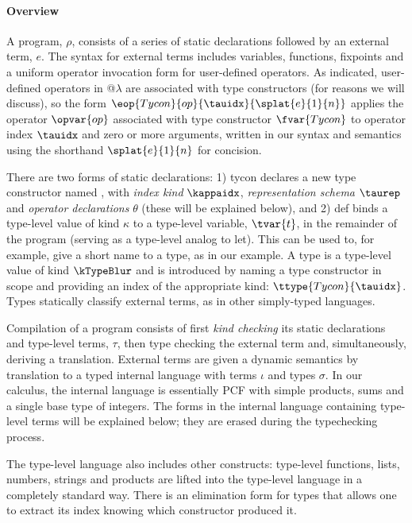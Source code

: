 \paragraph{Overview} A program, $\rho$, consists of a series of static declarations followed by an external term, $e$. The syntax for external terms includes variables, functions, fixpoints and a uniform operator invocation form for user-defined operators. As indicated, user-defined operators in @$\lambda$ are associated with type constructors (for reasons we will discuss), so the form $\eop{Tycon}{op}{\tauidx}{\splat{e}{1}{n}}$ applies the operator $\opvar{op}$ associated with type constructor $\fvar{Tycon}$ to operator index $\tauidx$ and zero or more arguments, written in our syntax and semantics using the shorthand ${\splat{e}{1}{n}}$ for concision.

There are two forms of static declarations: 1) \textsf{tycon} declares a new type constructor named , with \emph{index kind} $\kappaidx$, \emph{representation schema} $\taurep$ and \emph{operator declarations} $\theta$ (these will be explained below), and 2) \textsf{def} binds a type-level value of kind $\kappa$ to a type-level variable, $\tvar{t}$, in the remainder of the program (serving as a type-level analog to \textsf{let}). This can be used to, for example, give a short name to a type, as in our example. A type is a type-level value of kind $\kTypeBlur$ and is introduced by naming a type constructor in scope and providing an index of the appropriate kind: $\ttype{Tycon}{\tauidx}$. Types statically classify external terms, as in other simply-typed languages. 

Compilation of a program consists of first \emph{kind checking} its static declarations and type-level terms, $\tau$, then type checking the external term and, simultaneously, deriving a translation. External terms are given a dynamic semantics by translation to a typed internal language with terms $\iota$ and types $\sigma$. In our calculus, the internal language is essentially PCF with simple products, sums and a single base type of integers. The forms in the internal language containing type-level terms will be explained below; they are erased during the typechecking process. %


The type-level language also includes other constructs: type-level functions, lists, numbers, strings and products are lifted into the type-level language in a completely standard way. There is an elimination form for types that allows one to extract its index knowing which constructor produced it. 



